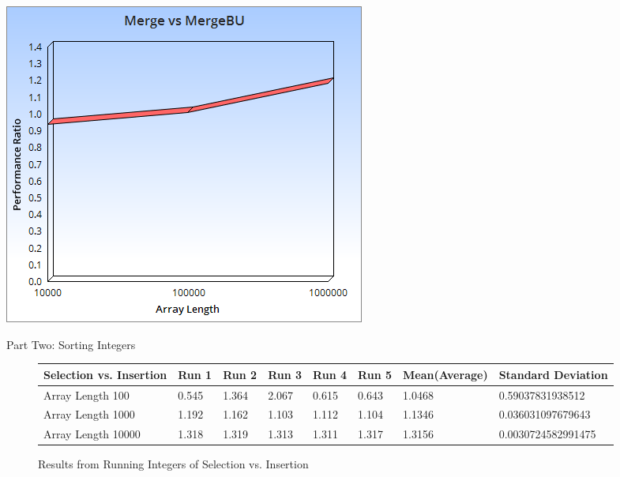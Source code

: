 \documentclass{article}
\begin{document}
\includegraphics[scale=0.5]{Doubles4.png}

\newpage
\begin{center}
Part Two: Sorting Integers
\end{center}


\begin{figure}[H]
\centering
\begin{adjustwidth}{-3.4cm}{}
\begin{tabular}{| l | l | l | l | l | l | l | l |}
\hline
Selection vs. Insertion & Run 1 & Run 2 & Run 3 & Run 4 & Run 5 & Mean(Average) & Standard Deviation\\ \hline
Array Length 100 & 0.545 & 1.364 & 2.067 & 0.615 & 0.643 & 1.0468 & 0.59037831938512 \\ \hline
Array Length 1000 & 1.192 & 1.162 & 1.103 & 1.112 & 1.104 & 1.1346 & 0.036031097679643  \\ \hline
Array Length 10000 & 1.318 & 1.319 & 1.313 & 1.311 & 1.317  & 1.3156 &  0.0030724582991475 \\ \hline
\end{tabular}
\caption{Results from Running  Integers of Selection vs. Insertion}
\end{adjustwidth}
\end{figure}
\end{document}

